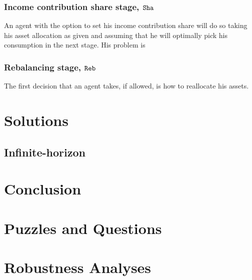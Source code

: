 \documentclass[./RiskyContrib.tex]{subfiles}
\begin{document}
\subsubsection{Income contribution share stage, $\mathtt{Sha}$}

An agent with the option to set his income contribution share will do so
taking his asset allocation as given and assuming that he will optimally
pick his consumption in the next stage. His problem is
\begin{equation*}

\end{equation*}

\subsubsection{Rebalancing stage, $\mathtt{Reb}$}

The first decision that an agent takes, if allowed, is how to reallocate his
assets.
\begin{equation*}

\end{equation*}

\hypertarget{Solutions}{}
\section{Solutions}

\subsection{Infinite-horizon}







\hypertarget{Conclusion}{}
\section{Conclusion}

\hypertarget{Puzzles-and-Questions}{}
\section{Puzzles and Questions}\label{sec:Puzzles}

\hypertarget{Robustness Analyses}{}
\section{Robustness Analyses}

\clearpage\vfill\eject

\onlyinsubfile{}
\end{document}

